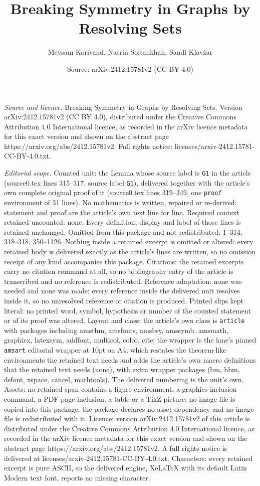 \documentclass[10pt,a4paper]{amsart}
\title[Breaking Symmetry in Graphs by Resolving Sets]{Breaking Symmetry in Graphs by Resolving Sets}
\author{Meysam Korivand, Nasrin Soltankhah, Sandi Klav\v{z}ar}
\date{Source: arXiv:2412.15781v2 (CC BY 4.0)}
\begin{document}
\maketitle

\noindent\emph{Source and licence.} Breaking Symmetry in Graphs by Resolving Sets. Version arXiv:2412.15781v2 (CC BY 4.0), distributed under the Creative Commons Attribution 4.0 International licence, as recorded in the arXiv licence metadata for this exact version and shown on the abstract page https://arxiv.org/abs/2412.15781v2. Full rights notice: licenses/arxiv-2412.15781-CC-BY-4.0.txt.\par\smallskip

\noindent\textit{Editorial scope.} Counted unit: the Lemma whose source label is \texttt{G1} in the article (source0.tex lines 315--317, source label \texttt{G1}), delivered together with the article's own complete original proof of it (source0.tex lines 319--349, one \texttt{proof} environment of 31 lines). No mathematics is written, repaired or re-derived: statement and proof are the article's own text line for line. Required context retained uncounted: none. Every definition, display and label of those lines is retained unchanged. Omitted from this package and not redistributed: 1--314, 318--318, 350--1126. Nothing inside a retained excerpt is omitted or altered: every retained body is delivered exactly as the article's lines are written, so no omission receipt of any kind accompanies this package. Citations: the retained excerpts carry no citation command at all, so no bibliography entry of the article is transcribed and no reference is redistributed. Reference adaptation: none was needed and none was made; every reference inside the delivered unit resolves inside it, so no unresolved reference or citation is produced. Printed slips kept literal: no printed word, symbol, hypothesis or number of the counted statement or of its proof was altered. Layout and class: the article's own class is \texttt{article} with packages including amsthm, amsfonts, amsbsy, amssymb, amsmath, graphicx, latexsym, addfont, multicol, color, cite; the wrapper is the lane's pinned \texttt{amsart} editorial wrapper at 10pt on A4, which restates the theorem-like environments the retained text needs and adds the article's own macro definitions that the retained text needs (none), with extra wrapper packages (bm, bbm, dsfont, xspace, cancel, mathtools). The delivered numbering is the unit's own. Assets: no retained span contains a figure environment, a graphics-inclusion command, a PDF-page inclusion, a table or a TikZ picture; no image file is copied into this package, the package declares no asset dependency and no image file is redistributed with it. Licence: version arXiv:2412.15781v2 of this article is distributed under the Creative Commons Attribution 4.0 International licence, as recorded in the arXiv licence metadata for this exact version and shown on the abstract page https://arxiv.org/abs/2412.15781v2. A full rights notice is delivered at licenses/arxiv-2412.15781-CC-BY-4.0.txt. Characters: every retained excerpt is pure ASCII, so the delivered engine, XeLaTeX with its default Latin Modern text font, reports no missing character.
\end{document}
